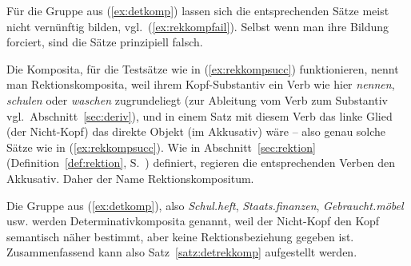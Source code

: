 \begin{exe}
  \ex\label{ex:rekkompsucc}
  \begin{xlist}
  \end{xlist}
\end{exe}

Für die Gruppe aus (\ref{ex:detkomp}) lassen sich die entsprechenden Sätze meist nicht vernünftig bilden, vgl.\ (\ref{ex:rekkompfail}).
Selbst wenn man ihre Bildung forciert, sind die Sätze prinzipiell falsch.
  
\begin{exe}
  \ex\label{ex:rekkompfail}
  \begin{xlist}
  \end{xlist}
\end{exe}

Die Komposita, für die Testsätze wie in (\ref{ex:rekkompsucc}) funktionieren, nennt man Rektionskomposita, weil ihrem Kopf-Substantiv ein Verb wie hier \textit{nennen}, \textit{schulen} oder \textit{waschen} zugrundeliegt (zur Ableitung vom Verb zum Substantiv vgl.\ Abschnitt~\ref{sec:deriv}), und in einem Satz mit diesem Verb das linke Glied (der Nicht-Kopf) das direkte Objekt (im Akkusativ) wäre -- also genau solche Sätze wie in (\ref{ex:rekkompsucc}).
Wie in Abschnitt~\ref{sec:rektion} (Definition~\ref{def:rektion}, S.~\pageref{def:rektion}) definiert, regieren die entsprechenden Verben den Akkusativ.
Daher der Name Rektionskompositum.

Die Gruppe aus (\ref{ex:detkomp}), also \textit{Schul.heft}, \textit{Staats.finanzen}, \textit{Gebraucht.möbel} usw. werden Determinativkomposita genannt, weil der Nicht-Kopf den Kopf semantisch näher bestimmt, aber keine Rektionsbeziehung gegeben ist.
Zusammenfassend kann also Satz~\ref{satz:detrekkomp} aufgestellt werden.


